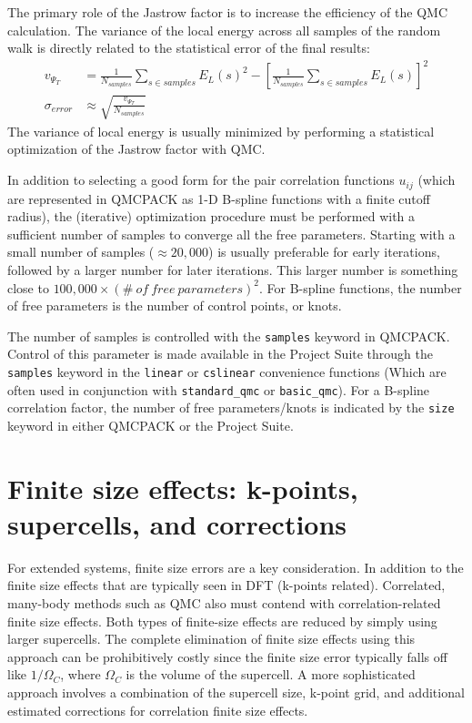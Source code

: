 \documentclass[oneside,11pt]{memoir}
\numberwithin{equation}{section}
\begin{document}
The primary role of the Jastrow factor is to increase the efficiency of the 
QMC calculation.  The variance of the local energy across all samples of the 
random walk is directly related to the statistical error of the final results: 
\begin{align}
  v_{\Psi_T} &= \frac{1}{N_{samples}}\sum_{s\in samples} E_L(s)^2 - \left[\frac{1}{N_{samples}}\sum_{s\in samples} E_L(s)\right]^2 \\
  \sigma_{error} &\approx \sqrt{\frac{v_{\Psi_T}}{N_{samples}}}
\end{align}
The variance of local energy is usually minimized by performing a statistical 
optimization of the Jastrow factor with QMC.  

In addition to selecting a good 
form for the pair correlation functions $u_{ij}$ (which are represented in 
QMCPACK as 1-D B-spline functions with a finite cutoff radius), the 
(iterative) optimization procedure must be performed with a sufficient number 
of samples to converge all the free parameters.  Starting with a small number 
of samples ($\approx 20,000$) is usually preferable for early iterations, 
followed by a larger number for later iterations.  This larger number is 
something close to $100,000\times (\#~of~free~parameters)^2$.  For B-spline 
functions, the number of free parameters is the number of control points, or knots.

The number of samples is controlled with the \texttt{samples} keyword in 
QMCPACK.  Control of this parameter is made available in the Project Suite 
through the \texttt{samples} keyword in the \texttt{linear} or 
\texttt{cslinear} convenience functions (Which are often used in conjunction 
with \texttt{standard\_qmc} or \texttt{basic\_qmc}).  For a B-spline 
correlation factor, the number of free parameters/knots is indicated by the 
\texttt{size} keyword in either QMCPACK or the Project Suite.


\section{Finite size effects: k-points, supercells, and corrections}
For extended systems, finite size errors are a key consideration.  In addition 
to the finite size effects that are typically seen in DFT (k-points related).  
Correlated, many-body methods such as QMC also must contend with 
correlation-related finite size effects.  Both types of finite-size effects 
are reduced by simply using larger supercells.  The complete 
elimination of finite size effects using this approach can be prohibitively 
costly since the finite size error typically falls off like $1/\Omega_C$, where 
$\Omega_C$ is the volume of the supercell.  A more sophisticated approach 
involves a combination of the supercell size, k-point grid, and additional 
estimated corrections for correlation finite size effects.
\end{document}

